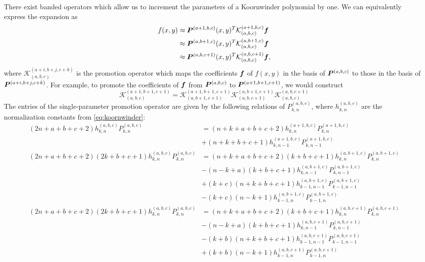 There exist banded operators which allow us to increment the parameters of a Koornwinder polynomial by one. We can equivalently express the expansion as 
\begin{align*}
	f(x,y)
	&\approx \boldsymbol{P}^{(a+1,b,c)}(x,y)^T\mathcal{K}_{(a,b,c)}^{(a+1,b,c)}\boldsymbol{f} \\
	&\approx \boldsymbol{P}^{(a,b+1,c)}(x,y)^T\mathcal{K}_{(a,b,c)}^{(a,b+1,c)}\boldsymbol{f} \\
	&\approx \boldsymbol{P}^{(a,b,c+1)}(x,y)^T\mathcal{K}_{(a,b,c)}^{(a,b,c+1)}\boldsymbol{f},
\end{align*}
where $\mathcal{K}_{(a,b,c)}^{(a+i,b+j,c+k)}$ is the promotion operator which maps the coefficients $\boldsymbol{f}$ of $f(x,y)$ in the basis of $\boldsymbol{P}^{(a,b,c)}$ to those in the basis of $\boldsymbol{P}^{(a+i,b+j,c+k)}$. For example, to promote the coefficients of $\boldsymbol{f}$ from $\boldsymbol{P}^{(a,b,c)}$ to $\boldsymbol{P}^{(a+1,b+1,c+1)}$, we would construct \begin{equation}
	\mathcal{K}_{(a,b,c)}^{(a+1,b+1,c+1)} = \mathcal{K}_{(a,b+1,c+1)}^{(a+1,b+1,c+1)}\mathcal{K}_{(a,b,c+1)}^{(a,b+1,c+1)}\mathcal{K}_{(a,b,c)}^{(a,b,c+1)}
\end{equation}
The entries of the single-parameter promotion operator are given by the following relations of $P_{k,n}^{(a,b,c)}$, where $h_{k,n}^{(a,b,c)}$ are the normalization constants from \eqref{eq:koornwinder}:
\begin{align}
(2n+a+b+c+2)h_{k,n}^{(a,b,c)}P_{k,n}^{(a,b,c)} &= (n+k+a+b+c+2)h_{k,n}^{(a+1,b,c)}P_{k,n}^{(a+1,b,c)}\nonumber\\
&+(n+k+b+c+1)h_{k,n-1}^{(a+1,b,c)}P_{k,n-1}^{(a+1,b,c)}\label{eq:ka}\\
(2n+a+b+c+2)(2k+b+c+1)h_{k,n}^{(a,b,c)}P_{k,n}^{(a,b,c)} &= (n+k+a+b+c+2)(k+b+c+1)h_{k,n}^{(a,b+1,c)}P_{k,n}^{(a,b+1,c)}\nonumber \\
&-(n-k+a)(k+b+c+1)h_{k,n-1}^{(a,b+1,c)}P_{k,n-1}^{(a,b+1,c)}\nonumber\\
&+(k+c)(n+k+b+c+1)h_{k-1,n-1}^{(a,b+1,c)}P_{k-1,n-1}^{(a,b+1,c)}\nonumber\\
&-(k+c)(n-k+1)h_{k-1,n}^{(a,b+1,c)}P_{k-1,n}^{(a,b+1,c)}\label{eq:kb}\\
(2n+a+b+c+2)(2k+b+c+1)h_{k,n}^{(a,b,c)}P_{k,n}^{(a,b,c)} &= (n+k+a+b+c+2)(k+b+c+1)h_{k,n}^{(a,b,c+1)}P_{k,n}^{(a,b,c+1)}\nonumber\\
&-(n-k+a)(k+b+c+1)h_{k,n-1}^{(a,b,c+1)}P_{k,n-1}^{(a,b,c+1)}\nonumber\\
&-(k+b)(n+k+b+c+1)h_{k-1,n-1}^{(a,b,c+1)}P_{k-1,n-1}^{(a,b,c+1)}\nonumber\\
&+(k+b)(n-k+1)h_{k-1,n}^{(a,b,c+1)}P_{k-1,n}^{(a,b,c+1)}\label{eq:kc}
\end{align}
